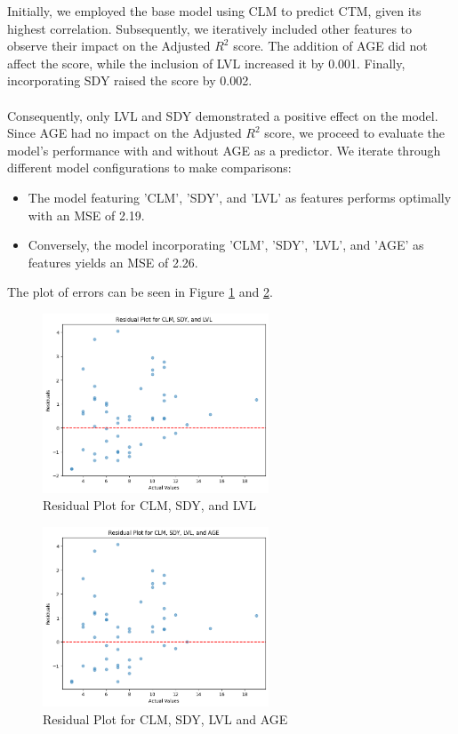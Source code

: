 \documentclass{article}
\begin{document}
\noindent Initially, we employed the base model using CLM to predict CTM, given its highest correlation. Subsequently, we iteratively included other features to observe their impact on the Adjusted \(R^2\) score. The addition of AGE did not affect the score, while the inclusion of LVL increased it by 0.001. Finally, incorporating SDY raised the score by 0.002.
\\\\
Consequently, only LVL and SDY demonstrated a positive effect on the model. Since AGE had no impact on the Adjusted \(R^2\) score, we proceed to evaluate the model's performance with and without AGE as a predictor. We iterate through different model configurations to make comparisons:

\begin{itemize}
  \item The model featuring 'CLM', 'SDY', and 'LVL' as features performs optimally with an MSE of 2.19.
  \item Conversely, the model incorporating 'CLM', 'SDY', 'LVL', and 'AGE' as features yields an MSE of 2.26.
\end{itemize}

\noindent The plot of errors can be seen in Figure \ref{RP} and \ref{RPAGE}.

\begin{figure}[H]
\centering
\includegraphics[width=0.6\textwidth]{RP without age.png}
\caption{Residual Plot for CLM, SDY, and LVL}
\label{RP}
\end{figure}

\begin{figure}[H]
\centering
\includegraphics[width=0.6\textwidth]{RP with age .png}
\caption{Residual Plot for CLM, SDY, LVL and AGE}
\label{RPAGE}
\end{figure}
\end{document}

